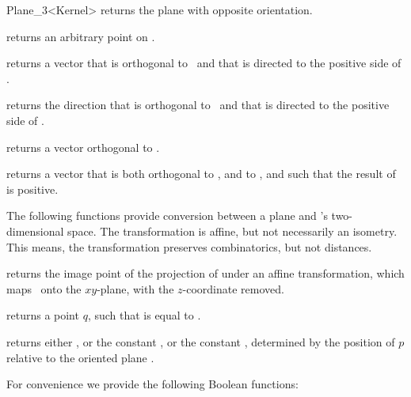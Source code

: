 \begin{ccRefClass} {Plane_3<Kernel>}
       {returns the plane with opposite orientation.}

       {returns an arbitrary point on \ccVar.}

       {returns a vector that is orthogonal to \ccVar\ and that
        is directed to the positive side of \ccVar.}

       {returns the direction that is orthogonal to \ccVar\ and that
        is directed to the positive side of \ccVar.}

       {returns a vector orthogonal to 
        .}

       {returns a vector that is both orthogonal to ,
        and to , and such that the result of 
         is positive.}


The following functions provide conversion between a plane and 
\cgal's two-dimensional space. The transformation is affine, but
not necessarily an isometry. This means, the transformation preserves
combinatorics, but not distances.

       {returns the image point of the projection of  
       under an affine transformation, which maps \ccVar\ onto the 
       $xy$-plane, with the $z$-coordinate removed.}

       {returns a point $q$, such that 
        is equal to .}

\ccPredicates

       {returns either , or
        the constant , or the constant
        , 
        determined by the position of $p$ relative to the oriented plane \ccVar.
        }

For convenience we provide the following Boolean functions:


\end{ccRefClass}
